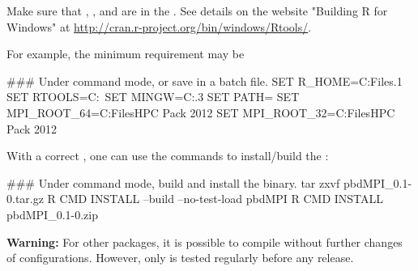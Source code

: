 Make sure that , , and  are in the
. See details on the website "Building R for Windows" at
\url{http://cran.r-project.org/bin/windows/Rtools/}.

For example, the minimum requirement may be
\begin{Command}
### Under command mode, or save in a batch file.
SET R_HOME=C:\Program Files\R{}.1
SET RTOOLS=C:\Rtools\bin\
SET MINGW=C:\Rtools{}.3\bin
SET PATH=%
SET MPI_ROOT_64=C:\Program Files\Microsoft HPC Pack 2012
SET MPI_ROOT_32=C:\Program Files\Microsoft HPC Pack 2012
\end{Command}

With a correct , one can use the  commands
to install/build the \pkg{pbdMPI}:
\begin{Command}
### Under command mode, build and install the binary.
tar zxvf pbdMPI_0.1-0.tar.gz
R CMD INSTALL --build --no-test-load pbdMPI
R CMD INSTALL pbdMPI_0.1-0.zip
\end{Command}


{\color{red} \bf Warning:} For other  packages, it is possible
to compile without further changes of configurations. However, only
\pkg{pbdMPI} is tested regularly before any release.

